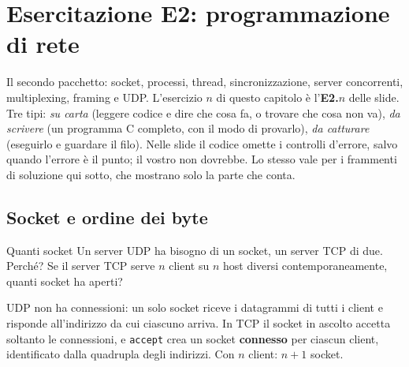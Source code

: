 \chapter{Esercitazione E2: programmazione di rete}

Il secondo pacchetto: socket, processi, thread, sincronizzazione, server concorrenti, multiplexing, framing e UDP. L'esercizio $n$ di
questo capitolo è l'\textbf{E2.$n$} delle slide. Tre tipi: \emph{su carta} (leggere codice e dire che cosa fa, o trovare che cosa non
va), \emph{da scrivere} (un programma C completo, con il modo di provarlo), \emph{da catturare} (eseguirlo e guardare il filo). Nelle
slide il codice omette i controlli d'errore, salvo quando l'errore è il punto; il vostro non dovrebbe. Lo stesso vale per i frammenti di
soluzione qui sotto, che mostrano solo la parte che conta.


\section{Socket e ordine dei byte}

\begin{esercizio}{Quanti socket}
Un server UDP ha bisogno di un socket, un server TCP di due. Perché? Se il server TCP serve $n$ client su $n$ host diversi
contemporaneamente, quanti socket ha aperti?

\svolgimento
UDP non ha connessioni: un solo socket riceve i datagrammi di tutti i client e risponde all'indirizzo da cui ciascuno arriva. In TCP il
socket in ascolto accetta soltanto le connessioni, e \texttt{accept} crea un socket \textbf{connesso} per ciascun client, identificato
dalla quadrupla degli indirizzi. Con $n$ client: $n + 1$ socket.
\end{esercizio}

